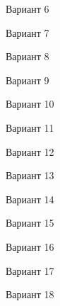 \begin{figure}[H]
    \centerline{}
    \caption{Вариант 6}
\end{figure}

\begin{figure}[H]
    \centerline{}
    \caption{Вариант 7}
\end{figure}

\begin{figure}[H]
    \centerline{}
    \caption{Вариант 8}
\end{figure}

\begin{figure}[H]
    \centerline{}
    \caption{Вариант 9}
\end{figure}

\begin{figure}[H]
    \centerline{}
    \caption{Вариант 10}
\end{figure}

\begin{figure}[H]
    \centerline{}
    \caption{Вариант 11}
\end{figure}

\begin{figure}[H]
    \centerline{}
    \caption{Вариант 12}
\end{figure}

\begin{figure}[H]
    \centerline{}
    \caption{Вариант 13}
\end{figure}

\begin{figure}[H]
    \centerline{}
    \caption{Вариант 14}
\end{figure}

\begin{figure}[H]
    \centerline{}
    \caption{Вариант 15}
\end{figure}

\begin{figure}[H]
    \centerline{}
    \caption{Вариант 16}
\end{figure}

\begin{figure}[H]
    \centerline{}
    \caption{Вариант 17}
\end{figure}

\begin{figure}[H]
    \centerline{}
    \caption{Вариант 18}
\end{figure}

